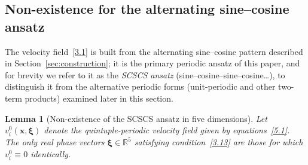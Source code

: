 \documentclass[11pt]{jfm}
\newtheorem{lemma}{Lemma}[section]
\numberwithin{equation}{section}
\begin{document}
\subsection{Non-existence for the alternating sine--cosine ansatz}
\label{subsec:5Dscscs}
The velocity field~\eqref{3.1} is built from the alternating sine--cosine pattern described
in Section~\ref{sec:construction}; it is the primary periodic ansatz of this paper,
and for brevity we refer to it as the \emph{SCSCS ansatz} (sine--cosine--sine--cosine\ldots),
to distinguish it from the alternative periodic forms (unit-periodic and other two-term
products) examined later in this section.
\begin{lemma}[Non-existence of the SCSCS ansatz in five dimensions]
\label{lem:5D_SCSCS}
Let $v_i^0(\boldsymbol{x}, \boldsymbol{\xi})$ denote the quintuple-periodic velocity field
given by equations~\eqref{5.1}. The only real phase vectors
$\boldsymbol{\xi}\in\mathbb{R}^5$ satisfying condition~\eqref{3.13} are those for which
$v_i^0 \equiv 0$ identically.
\end{lemma}
\end{document}

